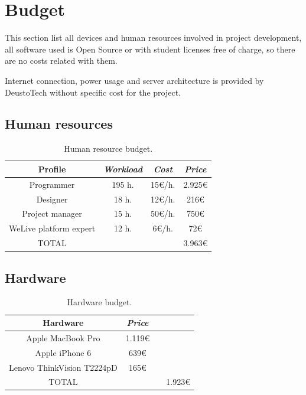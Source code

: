 \documentclass{DeustoFDP}
\begin{document}
\chapter{Budget}\label{cha:budget}
This section list all devices and human resources involved in project development, all software used is Open Source or with student licenses free of charge, so there are no costs related with them.

Internet connection, power usage and server architecture is provided by DeustoTech without specific cost for the project.

\section{Human resources}
\begin{table}[H]
	\centering
	\caption{Human resource budget.}\label{tab:budgetprofile}
	\begin{tabular}{cccc}
		\toprule
		\textbf{Profile} & \emph{Workload} & \emph{Cost} & \emph{Price}\\
		\midrule
		Programmer  & 195 h.     & 15€/h. & 2.925€ \\
		Designer   & 18 h.     & 12€/h. & 216€ \\
		Project manager & 15 h.     & 50€/h.  & 750€ \\
		WeLive platform expert & 12 h.     & 6€/h. & 72€ \\
		TOTAL & & & 3.963€\\
		\bottomrule
	\end{tabular}
\end{table}

\section{Hardware}
\begin{table}[H]
	\centering
	\caption{Hardware budget.}\label{tab:budgethardware}
	\begin{tabular}{cccc}
		\toprule
		\textbf{Hardware} & \emph{Price}\\
		\midrule
		Apple MacBook Pro  & 1.119€ \\
		Apple iPhone 6 & 639€ \\
		Lenovo ThinkVision T2224pD & 165€ \\
		
		TOTAL & & & 1.923€\\
		\bottomrule
	\end{tabular}
\end{table}
\end{document}
